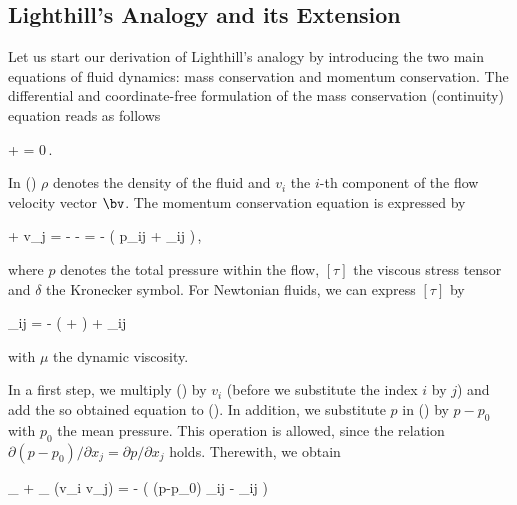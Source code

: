 \documentclass[a4paper,10pt]{article}
\begin{document}
\newpage
\subsection{Lighthill's Analogy and its Extension}
\label{sec:lighthill}

Let us start our derivation  of Lighthill's analogy by introducing the two
main  equations   of  fluid  dynamics:  mass   conservation  and  momentum
conservation. The differential and coordinate-free formulation of the mass
conservation (continuity) equation reads as follows

    +   = 0\,.
\ee

\noindent
In () $\rho$  denotes the density of the  fluid and $v_i$ the
$i$-th  component  of  the   flow  velocity  vector  $\bv$.  The  momentum
conservation equation is expressed by

\rho{} + \rho v_j  = 
-  -  =
-  \left( p\delta_{ij} + \tau_{ij} \right)\,,
\ee

\noindent
where $p$ denotes the total pressure within the flow, $[\tau]$ the viscous
stress tensor and $\delta$ the Kronecker symbol.  For Newtonian fluids, we
can express $[\tau]$ by

\tau_{ij} = - \mu \left(  +
   \right)
+  \mu \delta_{ij}   
\ee

\noindent
with $\mu$ the dynamic viscosity.

In  a  first  step,  we  multiply  ()  by  $v_i$  (before  we
substitute  the index  $i$ by  $j$) and  add the  so obtained  equation to
(). In addition, we  substitute $p$ in () by
$p - p_0$  with $p_0$ the mean pressure. This  operation is allowed, since
the relation $\partial (p-p_0) /  \partial x_j = \partial p /\partial x_j$
holds. Therewith, we obtain

_{\displaystyle{}}
+ _{\displaystyle{} (\rho v_i v_j)}
= - ( (p-p_0) \delta_{ij} - \tau_{ij} )
\ee
\end{document}
